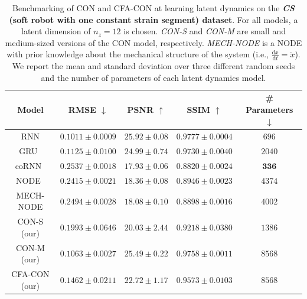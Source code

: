 \begin{table}[ht]
    \centering
    \begin{small}
    \begin{tabular}{c c c c c}
         \toprule
         \textbf{Model} & \textbf{RMSE} $\downarrow$ & \textbf{PSNR} $\uparrow$ & \textbf{SSIM} $\uparrow$ & \textbf{\# Parameters} $\downarrow$ \\
         \midrule
         RNN & $\mathbf{0.1011 \pm 0.0009}$ & $\mathbf{25.92 \pm 0.08}$ & $\mathbf{0.9777 \pm 0.0004}$ & $696$\\
         GRU~\cite{cho2014learning} & $0.1125 \pm 0.0100$ & $24.99 \pm 0.74$ & $0.9730 \pm 0.0040$ & $2040$\\
         coRNN~\cite{rusch2020coupled} & $0.2537 \pm 0.0018$ & $17.93 \pm 0.06$ & $0.8820 \pm 0.0024$ & $\mathbf{336}$\\
         NODE~\cite{chen2018neural} & $0.2415 \pm 0.0021$ & $18.36 \pm 0.08$ & $0.8946 \pm 0.0023$ & $4374$\\
         MECH-NODE & $0.2494 \pm 0.0028$ & $18.08 \pm 0.10$ & $0.8898 \pm 0.0016$ & $4002$\\
         CON-S (our) & $0.1993 \pm 0.0646$ & $20.03 \pm 2.44$ & $0.9218 \pm 0.0380$ & $1386$\\
         CON-M (our) & $0.1063 \pm 0.0027$ & $25.49 \pm 0.22$ & $0.9758 \pm 0.0011$ & $8568$\\
         CFA-CON (our) & $0.1462 \pm 0.0211$ & $22.72 \pm 1.17$ & $0.9573 \pm 0.0103$ & $8568$\\
         \bottomrule
    \end{tabular}
    \end{small}
    \vspace{0.5cm}
    \caption{Benchmarking of \gls{CON} and \gls{CFA-CON} at learning latent dynamics on the \textbf{\emph{CS} (soft robot with one constant strain segment) dataset}. For all models, a latent dimension of $n_z=12$ is chosen. \emph{CON-S} and \emph{CON-M} are small and medium-sized versions of the \gls{CON} model, respectively. \emph{MECH-NODE} is a \gls{NODE} with prior knowledge about the mechanical structure of the system (i.e., $\frac{\mathrm{d}x}{\mathrm{d}t} = \dot{x}$). We report the mean and standard deviation over three different random seeds and the number of parameters of each latent dynamics model.
}
    \label{tab:apx-con:latent_dynamics_results:cs}
\end{table}

